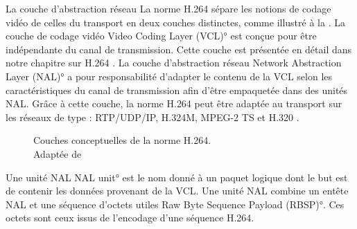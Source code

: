 \begin{section}{La couche d'abstraction réseau}
\label{sect-NAL}
La norme H.264 sépare les notions de codage vidéo de celles du transport en deux
couches distinctes, comme illustré à la . La couche de codage
vidéo \ang{Video Coding Layer (VCL)} est conçue pour être indépendante du canal
de transmission. Cette couche est présentée en détail dans notre chapitre sur
H.264 . La couche d'abstraction réseau \ang{Network Abstraction
Layer (NAL)} a pour responsabilité d'adapter le contenu de la VCL selon les
caractéristiques du canal de transmission afin d'être empaquetée dans des unités
NAL. Grâce à cette couche, la norme H.264 peut être adaptée au transport sur les
réseaux de type : RTP/UDP/IP, H.324M, MPEG-2 TS et H.320 \citep{Wenger2003}.

\begin{figure}
\centering
	\caption[Couches conceptuelles de la norme H.264]{Couches conceptuelles de la
norme H.264.\\Adaptée de \citet[p.~52]{Superiori2006}}
	\label{fig-NAL_VLC}
\end{figure}

Une unité NAL \ang{NAL unit} est le nom donné à un paquet logique dont le but
est de contenir les données provenant de la VCL. Une unité NAL combine un entête
NAL et une séquence d'octets utiles \ang{Raw Byte Sequence Payload (RBSP)}. Ces
octets sont ceux issus de l'encodage d'une séquence H.264.
\end{section}

